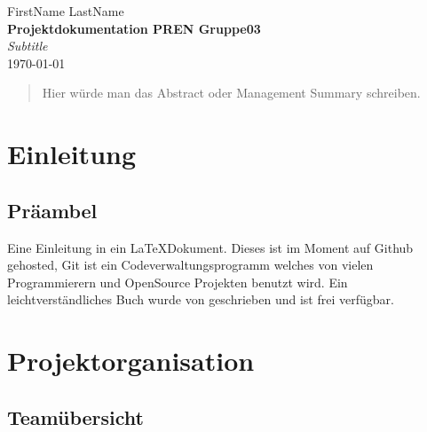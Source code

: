 \documentclass[a4paper]{report}
\newcommand*{\titleAP}{\begingroup %
	\centering
	\vspace*{\baselineskip} %
	
	{\Large FirstName LastName}\\[0.167\textheight] %
	
	{\Huge\bfseries Projektdokumentation PREN Gruppe03}\\[\baselineskip]
	
	{\Large \textit{Subtitle}}\\
	\today
	
	\vspace*{3\baselineskip} %
	\endgroup}
\begin{document}
\titleAP

\newpage

\begin{abstract}
	Hier würde man das Abstract oder Management Summary schreiben.
\end{abstract}

\tableofcontents

\newpage

\chapter{Einleitung}
\label{ch:Intro}

\section{Präambel}
Eine Einleitung in ein \LaTeX Dokument. 
Dieses ist im Moment auf Github gehosted, Git ist ein Codeverwaltungsprogramm welches von vielen Programmierern und OpenSource Projekten benutzt wird. \parencite{Git2017}
Ein leichtverständliches Buch wurde von \citeauthor{Chacon2016} geschrieben und ist frei verfügbar.

\chapter{Projektorganisation}

\section{Teamübersicht}

\newpage

\printbibliography
\end{document}
